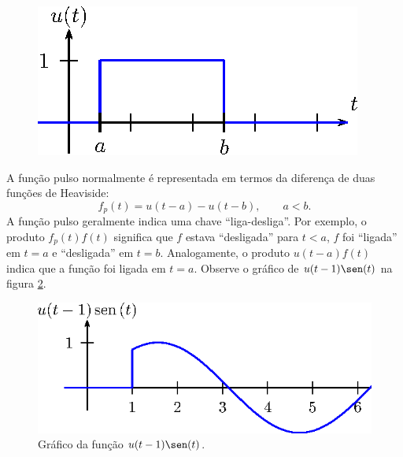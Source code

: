 \begin{figure}[!ht]
\begin{center}

\includegraphics{cap_trans_int/pics/figura_6}\end{center}
\caption{\label{fig_Heaviside_2}}
\end{figure}
A função pulso normalmente é representada em termos da diferença de duas funções de Heaviside:
\begin{equation}
f_p(t)=u(t-a)-u(t-b),\qquad a<b.
\end{equation}
A função pulso geralmente indica uma chave ``liga-desliga''. Por exemplo, o produto $f_p(t)f(t)$ significa que $f$ estava ``desligada'' para $t<a$, $f$ foi ``ligada'' em $t=a$ e ``desligada'' em $t=b$. Analogamente, o produto $u(t-a)f(t)$ indica que a função foi ligada em $t=a$. Observe o gráfico de $u(t-1)\sen(t)$ na figura \ref{fig_Heaviside_3}.
\begin{figure}[!ht]
\begin{center}

\includegraphics{cap_trans_int/pics/figura_7}\end{center}
\caption{\label{fig_Heaviside_3}Gráfico da função $u(t-1)\sen(t)$.}
\end{figure}
